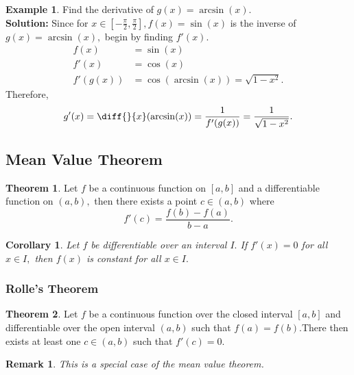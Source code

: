 \documentclass[12pt, a4paper]{article}
\newcommand{\f}[2]{\frac{#1}{#2}}
\newtheorem*{remark}{Remark}
\theoremstyle{definition}
\newtheorem{theorem}{Theorem}[section]
\newtheorem*{example}{Example}
\theoremstyle{plain}
\newtheorem{corollary}{Corollary}[theorem]
\begin{document}
\begin{example}
Find the derivative of $g(x)=\arcsin(x).$ \\
\textbf{Solution:} Since for $x\in\left[-\f{\pi}{2},\f{\pi}{2}\right], f(x)=\sin(x)$ is the inverse of $g(x)=\arcsin(x),$ begin by finding $f'(x).$ $$\begin{aligned}
f(x)&=\sin(x) \\
f'(x)&=\cos(x) \\
f'(g(x))&=\cos(\arcsin(x))=\sqrt{1-x^2}.
\end{aligned}$$ Therefore, $$g'(x)=\diff{}{x}(\arcsin(x))=\f{1}{f'(g(x))}=\f{1}{\sqrt{1-x^2}}.$$
\end{example}

\subsection{Mean Value Theorem}

\begin{theorem}
Let $f$ be a continuous function on $[a,b]$ and a differentiable function on $(a, b),$ then there exists a point $c \in (a, b)$ where $$f'(c)=\f{f(b)-f(a)}{b-a}.$$
\end{theorem}

\begin{corollary}
Let $f$ be differentiable over an interval $I.$ If $f'(x)=0$ for all $x\in I,$ then $f(x)$ is constant for all $x\in I.$
\end{corollary}

\subsubsection{Rolle's Theorem}

\begin{theorem}
Let $f$ be a continuous function over the closed interval $[a, b]$ and differentiable over the open interval $(a, b)$ such that $f(a) = f(b).$There then exists at least one $c \in (a, b)$ such that $f'(c) = 0.$
\end{theorem}

\begin{remark}
This is a special case of the mean value theorem.
\end{remark}
\end{document}
